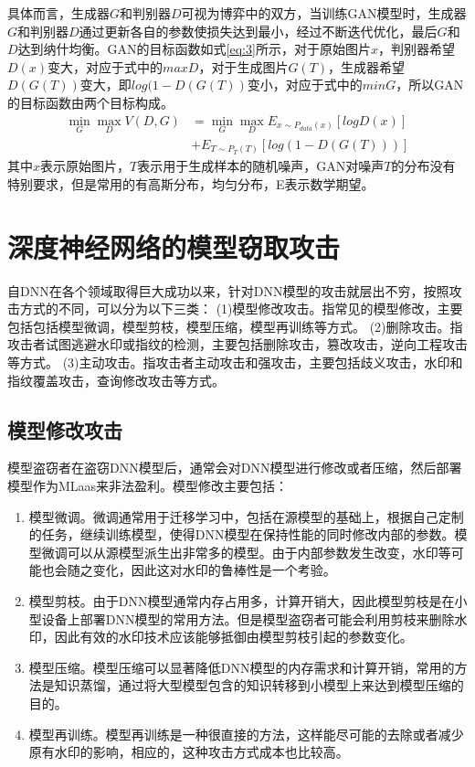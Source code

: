具体而言，生成器$G$和判别器$D$可视为博弈中的双方，当训练GAN模型时，生成器$G$和判别器$D$通过更新各自的参数使损失达到最小，经过不断迭代优化，最后$G$和$D$达到纳什均衡。GAN的目标函数如式\ref{eq:3}所示，对于原始图片$x$，判别器希望$D(x)$变大，对应于式中的$maxD$，对于生成图片$G(T)$，生成器希望$D(G(T))$变大，即$log(1 - D(G(T))$变小，对应于式中的$minG$，所以GAN的目标函数由两个目标构成。
\begin{equation}
	\label{eq:3}
	\begin{split}
		\mathop{min} \limits_{G} \mathop{max} \limits_{D} V(D, G) &= \mathop{min} \limits_{G} \mathop{max} \limits_{D} E_{x \sim P_{data}(x)}[logD(x)] \\
		&+ E_{T \sim P_{T}(T)}[log(1 - D(G(T)))]
	\end{split}
\end{equation}
其中$x$表示原始图片，$T$表示用于生成样本的随机噪声，GAN对噪声$T$的分布没有特别要求，但是常用的有高斯分布，均匀分布，E表示数学期望。

\section{深度神经网络的模型窃取攻击}

自DNN在各个领域取得巨大成功以来，针对DNN模型的攻击就层出不穷，按照攻击方式的不同，可以分为以下三类\cite{xue2021intellectual}：
(1)模型修改攻击。指常见的模型修改，主要包括包括模型微调，模型剪枝，模型压缩，模型再训练等方式。
(2)删除攻击。指攻击者试图逃避水印或指纹的检测，主要包括删除攻击，篡改攻击，逆向工程攻击等方式。
(3)主动攻击。指攻击者主动攻击和强攻击，主要包括歧义攻击，水印和指纹覆盖攻击，查询修改攻击等方式。

\subsection{模型修改攻击}

模型盗窃者在盗窃DNN模型后，通常会对DNN模型进行修改或者压缩，然后部署模型作为MLaas来非法盈利。模型修改主要包括：

\begin{enumerate}
	\renewcommand{\labelenumi}{\theenumi)}
	\item 模型微调。微调通常用于迁移学习中，包括在源模型的基础上，根据自己定制的任务，继续训练模型，使得DNN模型在保持性能的同时修改内部的参数。模型微调可以从源模型派生出非常多的模型。由于内部参数发生改变，水印等可能也会随之变化，因此这对水印的鲁棒性是一个考验。
	\item 模型剪枝。由于DNN模型通常内存占用多，计算开销大，因此模型剪枝是在小型设备上部署DNN模型的常用方法。但是模型盗窃者可能会利用剪枝来删除水印，因此有效的水印技术应该能够抵御由模型剪枝引起的参数变化。
	\item 模型压缩。模型压缩可以显著降低DNN模型的内存需求和计算开销，常用的方法是知识蒸馏，通过将大型模型包含的知识转移到小模型上来达到模型压缩的目的。
	\item 模型再训练\cite{namba2019robust}。模型再训练是一种很直接的方法，这样能尽可能的去除或者减少原有水印的影响，相应的，这种攻击方式成本也比较高。
\end{enumerate}



